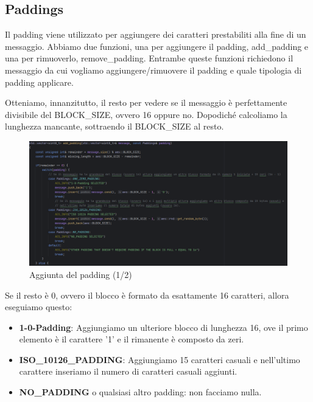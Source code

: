 \subsection{Paddings}

\textsf{\small Il padding viene utilizzato per aggiungere dei caratteri prestabiliti alla fine di un messaggio. Abbiamo due funzioni, una per aggiungere il padding, add\_padding e una per rimuoverlo, remove\_padding. Entrambe queste funzioni richiedono il messaggio da cui vogliamo aggiungere/rimuovere il padding e quale tipologia di padding applicare.} %

\textsf{\small Otteniamo, innanzitutto, il resto per vedere se il messaggio è perfettamente divisibile del BLOCK\_SIZE, ovvero 16 oppure no. Dopodiché calcoliamo la lunghezza mancante, sottraendo il BLOCK\_SIZE al resto.}

\begin{figure}[H]
	\centering
	\includegraphics[width=1\textwidth, height=1\textheight, keepaspectratio]{./images/code/cpp/padding/add_padding0.PNG}
	\caption{Aggiunta del padding (1/2)}
	\label{fig:add_padding0}
\end{figure}

\textsf{\small Se il resto è 0, ovvero il blocco è formato da esattamente 16 caratteri, allora eseguiamo questo:}

\begin{itemize}
	\item \textsf{\small \textbf{1-0-Padding}: Aggiungiamo un ulteriore blocco di lunghezza 16, ove il primo elemento è il carattere '1' e il rimanente è composto da zeri.}
	\item \textsf{\small \textbf{ISO\_10126\_PADDING}: Aggiungiamo 15 caratteri casuali e nell'ultimo carattere inseriamo il numero di caratteri casuali aggiunti.}
	\item \textsf{\small \textbf{NO\_PADDING} o qualsiasi altro padding: non facciamo nulla.}
\end{itemize}

